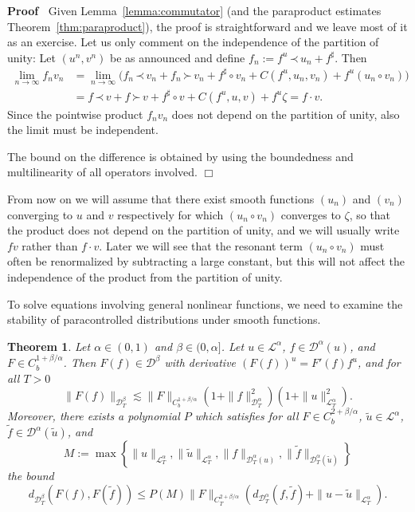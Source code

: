 \documentclass[a4paper,11pt]{article}
\newcommand{\assign}{:=}
\newcommand{\cdummy}{\cdot}
\newcommand{\nocomma}{}
\newenvironment{proof}{\noindent\textbf{Proof\ }}{\hspace*{\fill}$\Box$\medskip}
\newtheorem{theorem}{Theorem}
\newcommand{\LL}{\mathscr{L}}
\newcommand{\DD}{\mathscr{D}}
\newcommand{\lpara}{\,\mathord{\prec}\,}
\newcommand{\rpara}{\,\mathord{\succ}\,}
\newcommand{\reso}{\,\mathord{\circ}\,}
\begin{document}
\begin{proof}
   Given Lemma~\ref{lemma:commutator} (and the paraproduct estimates Theorem~\ref{thm:paraproduct}), the proof is straightforward and we leave most of it as an exercise. Let us only comment on the independence of the partition of unity: Let $(u^n, v^n)$ be as announced and define $f_n \assign f^u \lpara u_n + f^\sharp$. Then
   \begin{align*}
      \lim_{n\to \infty} f_n v_n & = \lim_{n \to \infty} \big( f_n \lpara v_n + f_n \rpara v_n +  f^{\sharp} \reso v_n + C (f^u, u_n, v_n) + f^u (u_n \circ v_n) \big) \\
      & =  f \lpara v + f \rpara v +  f^{\sharp} \reso v + C (f^u, u, v) + f^u \zeta = f\cdot v.
   \end{align*}
   Since the pointwise product $f_n v_n$ does not depend on the partition of unity, also the limit must be independent.
   
   The bound on the difference is obtained by using the boundedness and multilinearity of all operators involved.
\end{proof}

From now on we will assume that there exist smooth functions $(u_n)$ and $(v_n)$ converging to $u$ and $v$ respectively for which $(u_n \reso v_n)$ converges to $\zeta$, so that the product does not depend on the partition of unity, and we will usually write $f v$ rather than $f \cdummy v$. Later we will see that the resonant term $(u_n \circ v_n)$ must often be renormalized by subtracting a large constant, but this will not affect the independence of the product from the partition of unity.

To solve equations involving general nonlinear functions, we need to examine
the stability of paracontrolled distributions under smooth functions.

\begin{theorem}\label{thm:paralinearization}
   Let $\alpha \in (0, 1)$ and $\beta \in (0,
  \alpha]$. Let $u \in \LL^{\alpha}$, $f \in \DD^{\alpha} (u)$, and $F \in
  C^{1 + \beta / \alpha}_b$. Then $F (f) \in \DD^{\beta}$ with derivative $(F
  (f))^u = F' (f) f^u$, and for all $T > 0$
  \[
     \| F (f) \|_{\DD^{\beta}_T} \lesssim \| F \|_{C^{1 + \beta / \alpha}_b} ( 1 + \| f \|^2_{\DD^{\alpha}_T} ) ( 1 + \| u  \|_{\LL_T^{\alpha}}^2 ) .
  \]
  Moreover, there exists a polynomial $P$ which satisfies for all $F \in C^{2
  + \beta / \alpha}_b$, $\tilde{u} \in \LL^{\alpha} \nocomma$, $\tilde{f} \in
  \DD^{\alpha} (\tilde{u})$, and
  \[ M \assign \max \left\{ \| u \|_{\LL^{\alpha}_T}, \| \tilde{u}
     \|_{\LL^{\alpha}_T}, \|f\|_{\DD^{\alpha}_T (u)}, \| \tilde{f}
     \|_{\DD^{\alpha}_T (\tilde{u})} \right\} \]
  the bound
  \[ d_{\DD^{\beta}_T} (F (f), F (\tilde{f})) \leqslant P (M) \| F \|_{C^{2 +
     \beta / \alpha}_T} ( d_{\DD^{\alpha}_T} (f, \tilde{f}) + \| u -
     \tilde{u} \|_{\LL^{\alpha}_T} ) . \]
\end{theorem}
\end{document}
